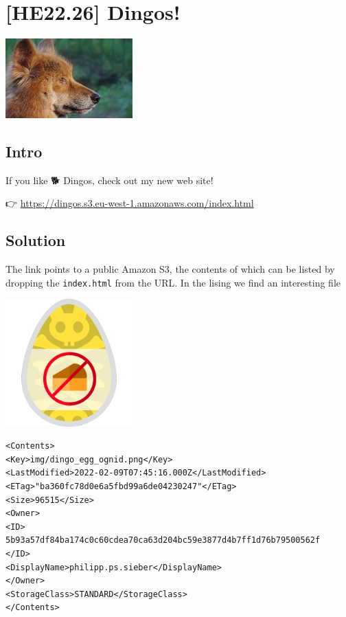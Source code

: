 
\hypertarget{he22.26}{%
\chapter{[HE22.26] Dingos!}\label{he22.26}}

\begin{marginfigure}
	\includegraphics[width=49mm]{level6/challenge26.jpg}
\end{marginfigure}
\section{Intro}
If you like {\NotoEmoji🐕} Dingos, check out my new web site!

{\NotoEmoji 👉} \href{my fancy Dingo web site}{https://dingos.s3.eu-west-1.amazonaws.com/index.html}

\section{Solution}\label{hv22.26solution}

The link points to a public Amazon S3, the contents of which can be listed by dropping the \verb+index.html+ from the URL.  In the lising we find an interesting file

\begin{marginfigure}
	\includegraphics[width=49mm]{level6/dingo_egg_ognid.png}
\end{marginfigure}

\begin{verbatim}
<Contents>
<Key>img/dingo_egg_ognid.png</Key>
<LastModified>2022-02-09T07:45:16.000Z</LastModified>
<ETag>"ba360fc78d0e6a5fbd99a6de04230247"</ETag>
<Size>96515</Size>
<Owner>
<ID>
5b93a57df84ba174c0c60cdea70ca63d204bc59e3877d4b7ff1d76b79500562f
</ID>
<DisplayName>philipp.ps.sieber</DisplayName>
</Owner>
<StorageClass>STANDARD</StorageClass>
</Contents>
\end{verbatim}

